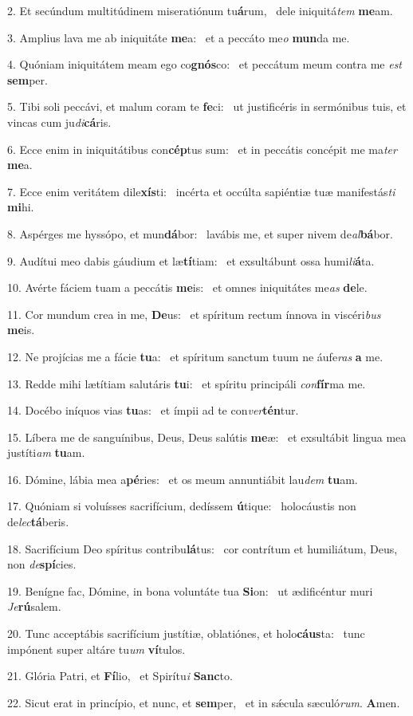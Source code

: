 2. Et secúndum multitúdinem miseratiónum tu\textbf{á}rum, \ast\  dele iniquitá\textit{tem} \textbf{me}am.\

3. Amplius lava me ab iniquitáte \textbf{me}a: \ast\  et a peccáto me\textit{o} \textbf{mun}da me.\

4. Quóniam iniquitátem meam ego co\textbf{gnós}co: \ast\  et peccátum meum contra me \textit{est} \textbf{sem}per.\

5. Tibi soli peccávi, et malum coram te \textbf{fe}ci: \ast\  ut justificéris in sermónibus tuis, et vincas cum ju\textit{di}\textbf{cá}ris.\

6. Ecce enim in iniquitátibus con\textbf{cép}tus sum: \ast\  et in peccátis concépit me ma\textit{ter} \textbf{me}a.\

7. Ecce enim veritátem dile\textbf{xís}ti: \ast\  incérta et occúlta sapiéntiæ tuæ manifestás\textit{ti} \textbf{mi}hi.\

8. Aspérges me hyssópo, et mun\textbf{dá}bor: \ast\  lavábis me, et super nivem de\textit{al}\textbf{bá}bor.\

9. Audítui meo dabis gáudium et læ\textbf{tí}tiam: \ast\  et exsultábunt ossa humi\textit{li}\textbf{á}ta.\

10. Avérte fáciem tuam a peccátis \textbf{me}is: \ast\  et omnes iniquitátes me\textit{as} \textbf{de}le.\

11. Cor mundum crea in me, \textbf{De}us: \ast\  et spíritum rectum ínnova in viscéri\textit{bus} \textbf{me}is.\

12. Ne projícias me a fácie \textbf{tu}a: \ast\  et spíritum sanctum tuum ne áufe\textit{ras} \textbf{a} me.\

13. Redde mihi lætítiam salutáris \textbf{tu}i: \ast\  et spíritu principáli \textit{con}\textbf{fír}ma me.\

14. Docébo iníquos vias \textbf{tu}as: \ast\  et ímpii ad te con\textit{ver}\textbf{tén}tur.\

15. Líbera me de sanguínibus, Deus, Deus salútis \textbf{me}æ: \ast\  et exsultábit lingua mea justíti\textit{am} \textbf{tu}am.\

16. Dómine, lábia mea a\textbf{pé}ries: \ast\  et os meum annuntiábit lau\textit{dem} \textbf{tu}am.\

17. Quóniam si voluísses sacrifícium, dedíssem \textbf{ú}tique: \ast\  holocáustis non de\textit{lec}\textbf{tá}beris.\

18. Sacrifícium Deo spíritus contribu\textbf{lá}tus: \ast\  cor contrítum et humiliátum, Deus, non \textit{de}\textbf{spí}cies.\

19. Benígne fac, Dómine, in bona voluntáte tua \textbf{Si}on: \ast\  ut ædificéntur muri \textit{Je}\textbf{rú}salem.\

20. Tunc acceptábis sacrifícium justítiæ, oblatiónes, et holo\textbf{cáus}ta: \ast\  tunc impónent super altáre tu\textit{um} \textbf{ví}tulos.\

21. Glória Patri, et \textbf{Fí}lio, \ast\  et Spirítu\textit{i} \textbf{Sanc}to.\

22. Sicut erat in princípio, et nunc, et \textbf{sem}per, \ast\  et in sǽcula sæculó\textit{rum}. \textbf{A}men.\

